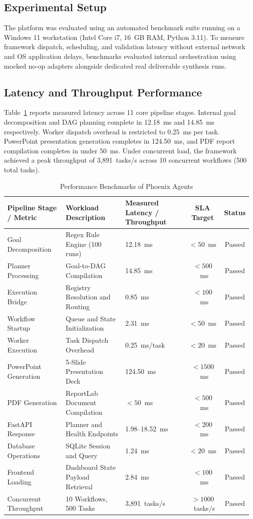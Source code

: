 \documentclass[conference]{IEEEtran}
\begin{document}
\subsection{Experimental Setup}
The platform was evaluated using an automated benchmark suite running on a Windows 11 workstation (Intel Core i7, 16~GB RAM, Python 3.11). To measure framework dispatch, scheduling, and validation latency without external network and OS application delays, benchmarks evaluated internal orchestration using mocked no-op adapters alongside dedicated real deliverable synthesis runs.

\subsection{Latency and Throughput Performance}
Table~\ref{tab:performance_benchmarks} reports measured latency across 11 core pipeline stages. Internal goal decomposition and DAG planning complete in 12.18~ms and 14.85~ms respectively. Worker dispatch overhead is restricted to 0.25~ms per task. PowerPoint presentation generation completes in 124.50~ms, and PDF report compilation completes in under 50~ms. Under concurrent load, the framework achieved a peak throughput of 3,891~tasks/s across 10 concurrent workflows (500 total tasks).

\begin{table}[t]
\centering
\caption{Performance Benchmarks of Phoenix Agents}
\label{tab:performance_benchmarks}
\footnotesize
\setlength{\tabcolsep}{5pt}
\begin{tabular*}{\textwidth}{@{\extracolsep{\fill}}lllcc@{}}
\toprule
\textbf{Pipeline Stage / Metric} & \textbf{Workload Description} & \textbf{Measured Latency / Throughput} & \textbf{SLA Target} & \textbf{Status} \\
\midrule
Goal Decomposition & Regex Rule Engine (100 runs) & 12.18~ms & $<50$~ms & Passed \\
Planner Processing & Goal-to-DAG Compilation & 14.85~ms & $<500$~ms & Passed \\
Execution Bridge & Registry Resolution and Routing & 0.85~ms & $<100$~ms & Passed \\
Workflow Startup & Queue and State Initialization & 2.31~ms & $<50$~ms & Passed \\
Worker Execution & Task Dispatch Overhead & 0.25~ms/task & $<20$~ms & Passed \\
PowerPoint Generation & 5-Slide Presentation Deck & 124.50~ms & $<1500$~ms & Passed \\
PDF Generation & ReportLab Document Compilation & $<50$~ms & $<500$~ms & Passed \\
FastAPI Response & Planner and Health Endpoints & 1.98--18.52~ms & $<200$~ms & Passed \\
Database Operations & SQLite Session and Query & 1.24~ms & $<20$~ms & Passed \\
Frontend Loading & Dashboard State Payload Retrieval & 2.84~ms & $<100$~ms & Passed \\
Concurrent Throughput & 10 Workflows, 500 Tasks & 3,891~tasks/s & $>1000$~tasks/s & Passed \\
\bottomrule
\end{tabular*}
\end{table}
\end{document}
